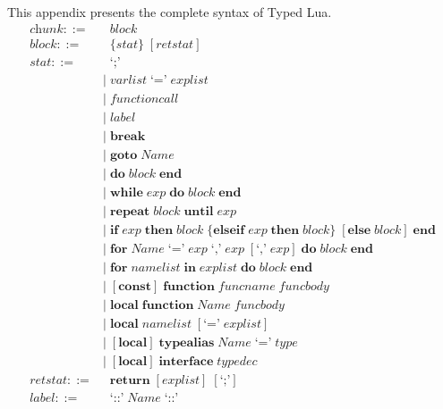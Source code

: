This appendix presents the complete syntax of Typed Lua.
\allowdisplaybreaks
\begin{align*}
\textit{chunk} ::= & \;\; \textit{block}\\
\textit{block} ::= & \;\; \{\textit{stat}\} \; [\textit{retstat}]\\
\textit{stat} ::= & \;\; \texttt{`;'}\\
& | \; \textit{varlist} \; \texttt{`='} \; \textit{explist}\\
& | \; \textit{functioncall}\\
& | \; \textit{label}\\
& | \; \textbf{break}\\ 
& | \; \textbf{goto} \; \textit{Name}\\
& | \; \textbf{do} \; \textit{block} \; \textbf{end}\\
& | \; \textbf{while} \; \textit{exp} \; \textbf{do} \; \textit{block} \; \textbf{end}\\
& | \; \textbf{repeat} \; \textit{block} \; \textbf{until} \; \textit{exp}\\
& | \; \textbf{if} \; \textit{exp} \; \textbf{then} \; \textit{block} \;
  \{\textbf{elseif} \; \textit{exp} \; \textbf{then} \; \textit{block}\} \;
  [\textbf{else} \; \textit{block}] \; \textbf{end}\\ 
& | \; \textbf{for} \; \textit{Name} \; \texttt{`='} \; \textit{exp} \;
  \texttt{`,'} \; \textit{exp} \; [\texttt{`,'} \; \textit{exp}] \;
  \textbf{do} \; \textit{block} \; \textbf{end}\\
& | \; \textbf{for} \; \textit{namelist} \; \textbf{in} \; \textit{explist} \;
  \textbf{do} \; \textit{block} \; \textbf{end}\\
& | \; [\textbf{const}] \; \textbf{function} \; \textit{funcname} \; \textit{funcbody}\\
& | \; \textbf{local} \; \textbf{function} \; \textit{Name} \; \textit{funcbody}\\
& | \; \textbf{local} \; \textit{namelist} \; [\texttt{`='} \; \textit{explist}]\\
& | \; [\textbf{local}] \; \textbf{typealias} \; \textit{Name} \; \texttt{`='} \; \textit{type}\\
& | \; [\textbf{local}] \; \textbf{interface} \; \textit{typedec}\\
\textit{retstat} ::= & \;\; \textbf{return} \; [\textit{explist}] \; [\texttt{`;'}]\\
\textit{label} ::= & \;\; \texttt{`::'} \; \textit{Name} \; \texttt{`::'}\\

\end{align*}
